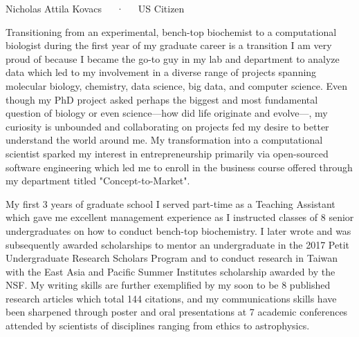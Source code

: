 \documentclass[11pt, letterpaper]{CV_latex_class}
\begin{document}
\makecvheader

\makecvfooter
  {Nicholas Attila Kovacs~~~·~~~US Citizen}

\makelettertitle

\begin{cvletter}


\hspace{1em} Transitioning from an experimental, bench-top biochemist to a computational biologist during the first year of my graduate career is a transition I am very proud of because I became the go-to guy in my lab and department to analyze data which led to my involvement in a diverse range of projects spanning molecular biology, chemistry, data science, big data, and computer science. Even though my PhD project asked perhaps the biggest and most fundamental question of biology or even science---how did life originate and evolve---, my curiosity is unbounded and collaborating on projects fed my desire to better understand the world around me. My transformation into a computational scientist sparked my interest in entrepreneurship primarily via open-sourced software engineering which led me to enroll in the business course offered through my department titled "Concept-to-Market".

\hspace{1em} My first 3 years of graduate school I served part-time as a Teaching Assistant which gave me excellent management experience as I instructed classes of 8 senior undergraduates on how to conduct bench-top biochemistry. I later wrote and was subsequently awarded scholarships to mentor an undergraduate in the 2017 Petit Undergraduate Research Scholars Program and to conduct research in Taiwan with the East Asia and Pacific Summer Institutes scholarship awarded by the NSF. My writing skills are further exemplified by my soon to be 8 published research articles which total 144 citations, and my communications skills have been sharpened through poster and oral presentations at 7 academic conferences attended by scientists of disciplines ranging from ethics to astrophysics.


\end{cvletter}
\end{document}
